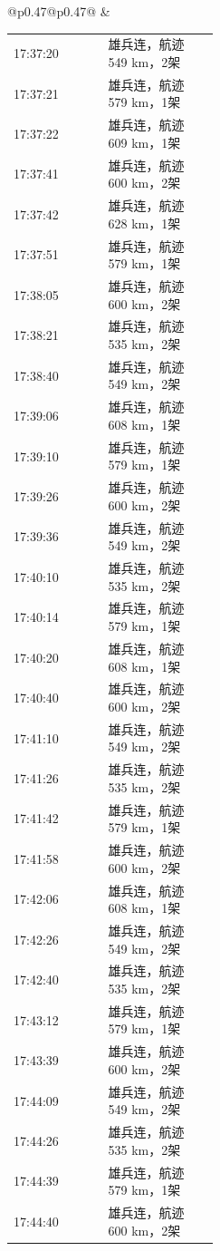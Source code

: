 \documentclass[UTF8,10pt,a4paper,fontset=fandol]{ctexart}
\begin{document}
\begin{tabular}{@{}p{0.47\linewidth}@{\hspace{0.05\linewidth}}p{0.47\linewidth}@{}}
&
\begin{tabular}[t]{@{}p{0.18\linewidth}p{0.27\linewidth}@{}}
17:37:20 & 雄兵连，航迹 549 km，2架\\
17:37:21 & 雄兵连，航迹 579 km，1架\\
17:37:22 & 雄兵连，航迹 609 km，1架\\
17:37:41 & 雄兵连，航迹 600 km，2架\\
17:37:42 & 雄兵连，航迹 628 km，1架\\
17:37:51 & 雄兵连，航迹 579 km，1架\\
17:38:05 & 雄兵连，航迹 600 km，2架\\
17:38:21 & 雄兵连，航迹 535 km，2架\\
17:38:40 & 雄兵连，航迹 549 km，2架\\
17:39:06 & 雄兵连，航迹 608 km，1架\\
17:39:10 & 雄兵连，航迹 579 km，1架\\
17:39:26 & 雄兵连，航迹 600 km，2架\\
17:39:36 & 雄兵连，航迹 549 km，2架\\
17:40:10 & 雄兵连，航迹 535 km，2架\\
17:40:14 & 雄兵连，航迹 579 km，1架\\
17:40:20 & 雄兵连，航迹 608 km，1架\\
17:40:40 & 雄兵连，航迹 600 km，2架\\
17:41:10 & 雄兵连，航迹 549 km，2架\\
17:41:26 & 雄兵连，航迹 535 km，2架\\
17:41:42 & 雄兵连，航迹 579 km，1架\\
17:41:58 & 雄兵连，航迹 600 km，2架\\
17:42:06 & 雄兵连，航迹 608 km，1架\\
17:42:26 & 雄兵连，航迹 549 km，2架\\
17:42:40 & 雄兵连，航迹 535 km，2架\\
17:43:12 & 雄兵连，航迹 579 km，1架\\
17:43:39 & 雄兵连，航迹 600 km，2架\\
17:44:09 & 雄兵连，航迹 549 km，2架\\
17:44:26 & 雄兵连，航迹 535 km，2架\\
17:44:39 & 雄兵连，航迹 579 km，1架\\
17:44:40 & 雄兵连，航迹 600 km，2架
\end{tabular}
\end{tabular}

\end{document}
